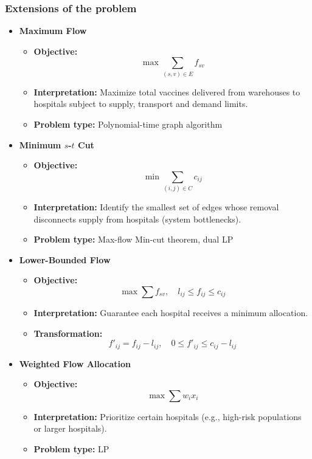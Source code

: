 \subsubsection{Extensions of the problem}
\begin{itemize}

\item \textbf{Maximum Flow}
\begin{itemize}
\item \textbf{Objective:} 
\[
\max \sum_{(s,v)\in E} f_{sv}
\]
\item \textbf{Interpretation:} Maximize total vaccines delivered from warehouses to hospitals subject to supply, transport and demand limits.
\item \textbf{Problem type:} Polynomial-time graph algorithm
\end{itemize}

\item \textbf{Minimum $s$-$t$ Cut}
\begin{itemize}
\item \textbf{Objective:}
\[
\min \sum_{(i,j)\in C} c_{ij}
\]
\item \textbf{Interpretation:} Identify the smallest set of edges whose removal disconnects supply from hospitals (system bottlenecks).
\item \textbf{Problem type:} Max-flow Min-cut theorem, dual LP
\end{itemize}

\item \textbf{Lower-Bounded Flow}
\begin{itemize}
\item \textbf{Objective:}
\[
\max \sum f_{sv}, \quad l_{ij} \le f_{ij} \le c_{ij}
\]
\item \textbf{Interpretation:} Guarantee each hospital receives a minimum allocation.
\item \textbf{Transformation:}
\[
f'_{ij} = f_{ij} - l_{ij}, \quad 0 \le f'_{ij} \le c_{ij} - l_{ij}
\]
\end{itemize}

\item \textbf{Weighted Flow Allocation}
\begin{itemize}
\item \textbf{Objective:}
\[
\max \sum w_i x_i
\]
\item \textbf{Interpretation:} Prioritize certain hospitals (e.g., high-risk populations or larger hospitals).
\item \textbf{Problem type:} LP
\end{itemize}


\end{itemize}
